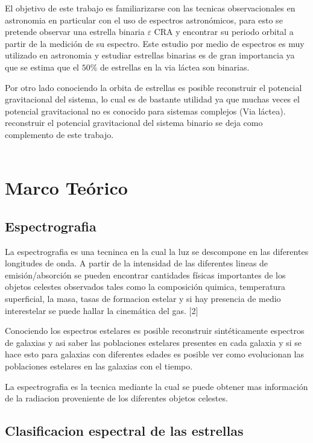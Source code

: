\documentclass[Proceedings]{ascelike}
\begin{document}
El objetivo de este trabajo es familiarizarse con las tecnicas observacionales en astronomia en particular
con el uso de espectros astron\'omicos, para esto se pretende observar una estrella binaria $\varepsilon$ CRA 
y encontrar su periodo orbital a partir de la medici\'on de su espectro. Este estudio por medio de espectros es muy utilizado en astronomia y estudiar estrellas binarias es de gran importancia ya que se estima que el $50\%$ de estrellas en la via l\'actea son binarias.  

Por otro lado conociendo la orbita de estrellas es posible reconstruir el potencial gravitacional 
del sistema, lo cual es de bastante utilidad ya que muchas veces el potencial gravitacional no es conocido para sistemas complejos (Via l\'actea). reconstruir el potencial gravitacional del sistema binario se deja como 
complemento de este trabajo.\\
\\

\section{Marco Te\'orico}

\subsection{Espectrografia}

La espectrografia es una tecninca en la cual la luz se descompone en las diferentes
longitudes de onda. A partir de la intensidad de las diferentes lineas de emisi\'on/absorci\'on
se pueden encontrar cantidades f\'isicas importantes de los objetos celestes observados tales 
como la composici\'on quimica, temperatura superficial, la masa, tasas de formacion estelar
 y si hay presencia de medio interestelar se puede hallar la cinem\'atica del gas. [2]
 
Conociendo los espectros estelares es posible reconstruir sint\'eticamente espectros de galaxias
y asi saber las poblaciones estelares presentes en cada galaxia y si se hace esto para galaxias
con diferentes edades es posible ver como evolucionan las poblaciones estelares en las galaxias 
con el tiempo.

La espectrografia es la tecnica mediante la cual se puede obtener mas informaci\'on de la radiacion 
proveniente de los diferentes objetos celestes.

\subsection{Clasificacion espectral de las estrellas}
\end{document}
